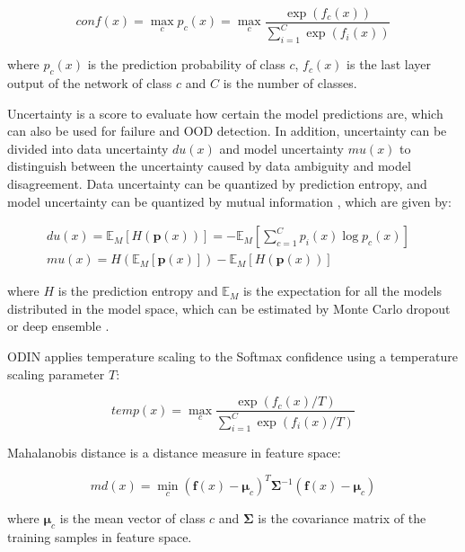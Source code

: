 \documentclass[journal]{IEEEtran}
\begin{document}
\begin{equation}
conf(x) = \max_c p_c(x) = \max_c \frac{\exp (f_c(x))}{\sum_{i=1}^{C} \exp (f_i(x))}
\end{equation}

where $p_c(x)$ is the prediction probability of class $c$, $f_c(x)$ is the last layer output of the network of class $c$ and $C$ is the number of classes. 

Uncertainty is a score to evaluate how certain the model predictions are, which can also be used for failure and OOD detection. In addition, uncertainty can be divided into data uncertainty $du(x)$ and model uncertainty $mu(x)$ to distinguish between the uncertainty caused by data ambiguity and model disagreement. Data uncertainty can be quantized by prediction entropy, and model uncertainty can be quantized by mutual information \cite{malinin2019uncertainty}, which are given by:

\begin{equation}
\begin{array}{lr}
du(x) = \mathbb{E}_M[H(\bm{p}(x))] = -\mathbb{E}_M[\sum_{c=1}^{C} p_i(x) \log p_c(x)] & \\
mu(x) = H(\mathbb{E}_M[\bm{p}(x)]) - \mathbb{E}_M[H(\bm{p}(x))] &
\end{array}
\end{equation}

where $H$ is the prediction entropy and $\mathbb{E}_M$ is the expectation for all the models distributed in the model space, which can be estimated by Monte Carlo dropout \cite{gal2016dropout} or deep ensemble \cite{lakshminarayanan2016simple}. 

ODIN \cite{liang2017enhancing} applies temperature scaling to the Softmax confidence using a temperature scaling parameter $T$:

\begin{equation}
temp(x) = \max_c \frac{\exp (f_c(x)/T)}{\sum_{i=1}^{C} \exp (f_i(x)/T)}
\end{equation}

Mahalanobis distance \cite{lee2018simple} is a distance measure in feature space:

\begin{equation}
md(x) = \min_c (\bm{f}(x) - \bm{\mu}_c)^{T} \bm{\Sigma}^{-1} (\bm{f}(x) - \bm{\mu}_c)
\end{equation}

where $\bm{\mu}_c$ is the mean vector of class $c$ and $\bm{\Sigma}$ is the covariance matrix of the training samples in feature space.
\end{document}
